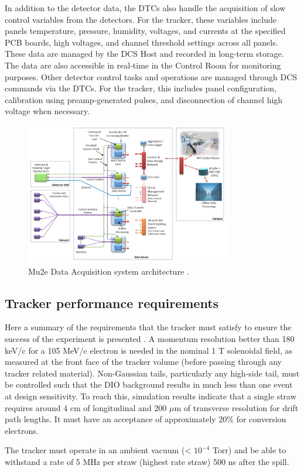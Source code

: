 In addition to the detector data, the DTCs also handle the acquisition of 
slow control variables from the detectors. For the tracker, these variables 
include panels temperature, pressure, humidity, voltages, and currents at 
the specified PCB boards, high voltages, and channel threshold settings across 
all panels. These data are managed by the DCS Host and recorded in long-term 
storage. The data are also accessible in real-time in the Control Room for 
monitoring purposes. Other detector control tasks and operations are managed 
through DCS commands via the DTCs. For the tracker, this includes panel 
configuration, calibration using preamp-generated pulses, and disconnection 
of channel high voltage when necessary. 

\begin{figure}[!h]
    \centering
    \includegraphics[width =0.8\textwidth]{figures/png/Screenshot_20240206_144803.png}
    \caption[The Mu2e Data Acquisition system architecture.]{Mu2e Data Acquisition system architecture \cite{GIOIOSA2023167732}.}
    \label{fig:linktodaq}
    \end{figure}



\subsection{Tracker performance requirements}
Here a summary of the requirements that the tracker must satisfy to ensure the 
success of the experiment is presented \cite{trkreq}.
A momentum resolution better than 180 keV/c for a 105 MeV/c electron is needed in the nominal
1 T solenoidal field, as measured at the front face of the tracker volume (before
passing through any tracker related material). Non-Gaussian tails, particularly any
high-side tail, must be controlled such that the DIO background results in much less
than one event at design sensitivity. To reach this, simulation results indicate that 
a single straw requires around 4 cm of longitudinal and 200 $\mu$m of transverse 
resolution for drift path lengths. 
It must have an acceptance of approximately 20\% for conversion electrons.

The tracker must operate in an ambient vacuum (< $10^{-4}$ Torr) and be able to withstand a rate of 5 MHz per straw (highest rate straw) 
500 ns after the spill. 

